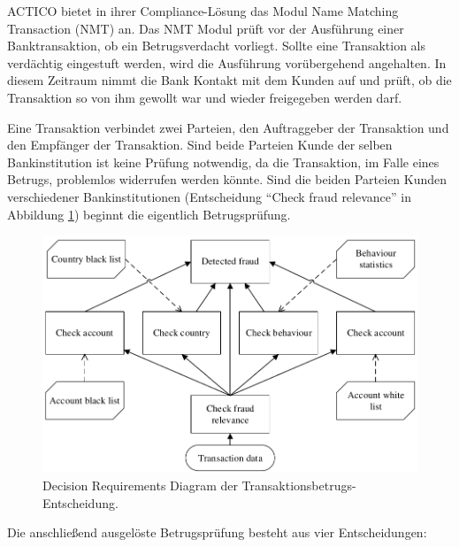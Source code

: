 ACTICO bietet in ihrer Compliance-Lösung \cite{AC17} das Modul Name Matching Transaction (NMT) \cite{AN17} an. Das NMT Modul prüft vor der Ausführung einer Banktransaktion, ob ein Betrugsverdacht vorliegt. Sollte eine Transaktion als verdächtig eingestuft werden, wird die Ausführung vorübergehend angehalten. In diesem Zeitraum nimmt die Bank Kontakt mit dem Kunden auf und prüft, ob die Transaktion so von ihm gewollt war und wieder freigegeben werden darf. 

Eine Transaktion verbindet zwei Parteien, den Auftraggeber der Transaktion und den Empfänger der Transaktion. Sind beide Parteien Kunde der selben Bankinstitution ist keine Prüfung notwendig, da die Transaktion, im Falle eines Betrugs, problemlos widerrufen werden könnte. Sind die beiden Parteien Kunden verschiedener Bankinstitutionen (Entscheidung "`Check fraud relevance"' in Abbildung \ref{fig:fraud-dmn}) beginnt die eigentlich Betrugsprüfung.  

\begin{figure}[ht]
\centering
\includegraphics{images/fraud-dmn.pdf}
\caption{Decision Requirements Diagram der Transaktionsbetrugs-Entscheidung.}
\label{fig:fraud-dmn}
\end{figure}

Die anschließend ausgelöste Betrugsprüfung besteht aus vier Entscheidungen:

